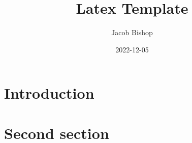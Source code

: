 \documentclass{article}
\title{Latex Template}
\author{Jacob Bishop}
\date{2022-12-05}
\begin{document}
\maketitle

\section{Introduction}



\newpage

\section{Second section}


\end{document}
